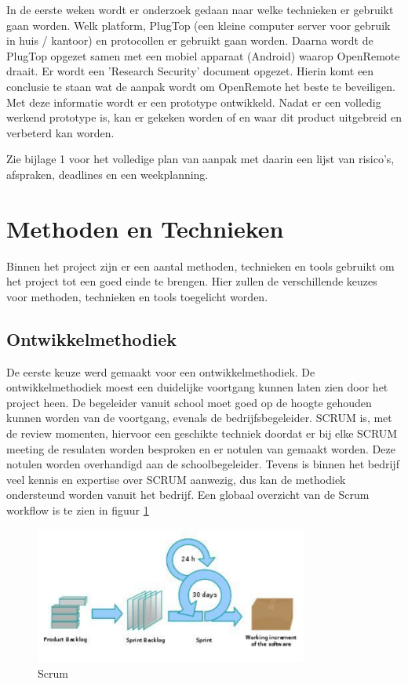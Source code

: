 \documentclass[]{article}
\begin{document}
In de eerste weken wordt  er  onderzoek  gedaan  naar  welke  technieken  er
gebruikt gaan worden. Welk platform,  PlugTop (een kleine computer server voor
gebruik in huis / kantoor)  en  protocollen  er  gebruikt gaan worden. Daarna
wordt de PlugTop opgezet samen met een  mobiel  apparaat (Android)  waarop
OpenRemote  draait. Er wordt een 'Research  Security' document opgezet. Hierin
komt een conclusie te staan wat de aanpak wordt  om OpenRemote het beste  te
beveiligen.  Met  deze  informatie  wordt  er  een prototype ontwikkeld. Nadat
er een volledig werkend  prototype  is,  kan  er gekeken worden of en waar dit
product uitgebreid en verbeterd kan worden.

Zie bijlage 1 voor het volledige plan van aanpak met daarin een lijst  van
risico's,  afspraken,  deadlines  en  een weekplanning.

\newpage
\section{Methoden en Technieken}

Binnen het project zijn er een aantal methoden, technieken en tools
gebruikt om het project tot een goed einde te brengen. Hier zullen de
verschillende keuzes voor methoden, technieken en tools toegelicht worden.

\subsection{Ontwikkelmethodiek}
De eerste keuze werd gemaakt voor een ontwikkelmethodiek. De ontwikkelmethodiek
moest een duidelijke voortgang kunnen laten zien door het project heen. De
begeleider vanuit school moet goed op de hoogte gehouden kunnen worden van
de voortgang, evenals de bedrijfsbegeleider. SCRUM is, met de review
momenten, hiervoor een geschikte techniek doordat er bij elke SCRUM meeting de
resulaten worden besproken en er notulen van gemaakt worden. Deze notulen worden
overhandigd aan de schoolbegeleider. Tevens is binnen het bedrijf veel
kennis en expertise over SCRUM aanwezig, dus kan de methodiek ondersteund worden
vanuit het bedrijf. Een globaal overzicht van de Scrum workflow is te zien in
figuur \ref{scrum}

\begin{figure}[htpb]
  \begin{center}
    \includegraphics[width=0.80\textwidth]{scrum.pdf}
  \end{center}
  \caption{Scrum}
  \label{scrum}
\end{figure}
\end{document}
